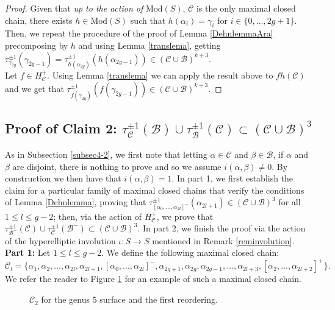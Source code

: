 \documentclass[twoside,11pt,a4paper]{article}
\newcommand*{\fun}[3]{#1: #2 \rightarrow #3}
\newcommand*{\Mod}[1]{\mathrm{Mod}(#1)}
\newcommand*{\Cf}{\mathscr{C}}
\newcommand*{\Bf}{\mathscr{B}}
\newcommand*{\Hcf}{H_{\Cf}}
\newcommand*{\Hcp}{\Hcf^{+}}
\begin{document}
\begin{proof}
 Given that \textit{up to the action of} $\Mod{S}$, $\Cf$ is the only maximal closed chain, there exists $h \in \Mod{S}$ such that $h(\alpha_{i}) = \gamma_{i}$ for $i \in \{0, \ldots, 2g+1\}$. Then, we repeat the procedure of the proof of Lemma \ref{DehnlemmaAra} precomposing by $h$ and using Lemma \ref{translema}, getting $\tau_{\gamma_{2g}}^{\pm 1}(\gamma_{2g-1}) = \tau_{h(\alpha_{2g})}^{\pm 1}(h(\alpha_{2g-1})) \in (\Cf \cup \Bf)^{k+3}$.\\
 \indent Let $f \in \Hcp$. Using Lemma \ref{translema} we can apply the result above to $fh(\Cf)$ and we get that $\tau_{f(\gamma_{2g})}^{\pm 1}(f(\gamma_{2g-1})) \in (\Cf \cup \Bf)^{k+3}$.
\end{proof}
\subsection{Proof of Claim 2: $\tau_{\Cf}^{\pm 1}(\Bf) \cup \tau_{\Bf}^{\pm 1}(\Cf) \subset (\Cf \cup \Bf)^{3}$}\label{subsec4-3}
\indent As in Subsection \ref{subsec4-2}, we first note that letting $\alpha \in \Cf$ and $\beta \in \Bf$, if $\alpha$ and $\beta$ are disjoint, there is nothing to prove and so we assume $i(\alpha,\beta) \neq 0$. By construction we then have that $i(\alpha,\beta) = 1$. In part 1, we first establish the claim for a particular family of maximal closed chains that verify the conditions of Lemma \ref{Dehnlemma}, proving that $\tau_{[\alpha_{0},\ldots,\alpha_{2l}]^{-}}^{\pm 1}(\alpha_{2l+1}) \in (\Cf \cup \Bf)^{3}$ for all $1 \leq l \leq g-2$; then, via the action of $\Hcp$, we prove that $\tau_{\Bf^{-}}^{\pm 1}(\Cf) \cup \tau_{\Cf}^{\pm 1}(\Bf^{-}) \subset (\Cf \cup \Bf)^{3}$. In part 2, we finish the proof via the action of the hyperelliptic involution $\fun{\iota}{S}{S}$ mentioned in Remark \ref{reminvolution}.\\[0.5cm]
\textbf{Part 1:} Let $1 \leq l \leq g-2$. We define the following maximal closed chain: $$\Cf_{l} = \{\alpha_{1}, \alpha_{2}, \ldots, \alpha_{2l}, \alpha_{2l+1}, [\alpha_{0}, \ldots, \alpha_{2l}]^{-}, \alpha_{2g+1}, \alpha_{2g}, \alpha_{2g-1}, \ldots, \alpha_{2l+3}, [\alpha_{2}, \ldots, \alpha_{2l+2}]^{+}\}.$$
We refer the reader to Figure \ref{SecondChain} for an example of such a maximal closed chain.
\begin{figure}[h]
\begin{center}
 \resizebox{11cm}{!}{} \caption{$\Cf_{2}$ for the genus $5$ surface and the first reordering.}\label{SecondChain}
\end{center}
\end{figure}\\
\end{document}
